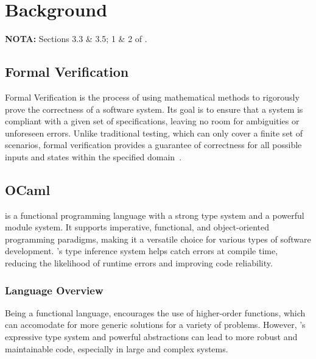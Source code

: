 
%

\chapter{Background}
\label{cha:background}

\textbf{NOTA:} Sections 3.3 \& 3.5; 1 \& 2 of \cite{Brain2025}.

\section{Formal Verification}
\label{sec:formal_verification}

Formal Verification is the process of using mathematical methods to rigorously 
prove the correctness of a software system. Its goal is to ensure that a system 
is compliant with a given set of specifications, leaving no room for ambiguities or 
unforeseen errors. Unlike traditional testing, which can only cover a 
finite set of scenarios, formal verification provides a guarantee of 
correctness for all possible inputs and states within the specified domain~\cite{Brain2025}.

\section{OCaml}
\label{sec:ocaml}

\ocaml is a functional programming language with a strong type system and a powerful
module system. It supports imperative, functional, and object-oriented programming 
paradigms, making it a versatile choice for various types of software development. 
\ocaml's type inference system helps catch errors at compile time, reducing the 
likelihood of runtime errors and improving code reliability.

\subsection{Language Overview} %
\label{sub:language_overview}

Being a functional language, \ocaml encourages the use of higher-order functions, 
which can accomodate for more generic solutions for a variety of problems. However,
\ocaml's expressive type system and powerful abstractions can lead to more robust
and maintainable code, especially in large and complex systems.

